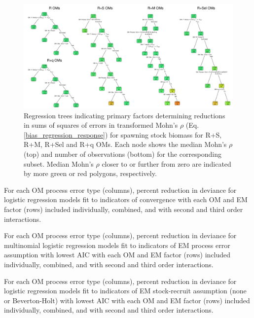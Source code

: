 \documentclass[
  12pt,
]{article}
\begin{document}
\begin{landscape}
\begin{figure}
\begin{center}
\includegraphics{SSB_mohns_rho_regtree_plots}
\end{center}
\caption{Regression trees indicating primary factors determining reductions in sums of squares of errors in transformed Mohn's $\rho$ (Eq. \ref{bias_regression_response}) for spawning stock biomass for R+S, R+M, R+Sel and R+q OMs. Each node shows the median Mohn's $\rho$ (top) and number of observations (bottom) for the corresponding subset. Median Mohn's $\rho$ closer to or further from zero are indicated by more green or red polygons, respectively.}\label{SSB_mohns_rho_regtree}
\end{figure}
\end{landscape}

\pagebreak

\begin{table}
\caption{For each OM process error type (columns), percent reduction in deviance for logistic regression models fit to indicators of convergence with each OM and EM factor (rows) included individually, combined, and with second and third order interactions.}\label{convergence_PRD_table}
{}
\end{table}

\begin{table}
\caption{For each OM process error type (columns), percent reduction in deviance for multinomial logistic regression models fit to indicators of EM process error assumption with lowest AIC with each OM and EM factor (rows) included individually, combined, and with second and third order interactions.}\label{AIC_PE_PRD_table}
{}
\end{table}

\begin{table}
\caption{For each OM process error type (columns), percent reduction in deviance for logistic regression models fit to indicators of EM stock-recruit assumption (none or Beverton-Holt) with lowest AIC with each OM and EM factor (rows) included individually, combined, and with second and third order interactions.}\label{AIC_SRR_PRD_table}
{}
\end{table}
\end{document}
